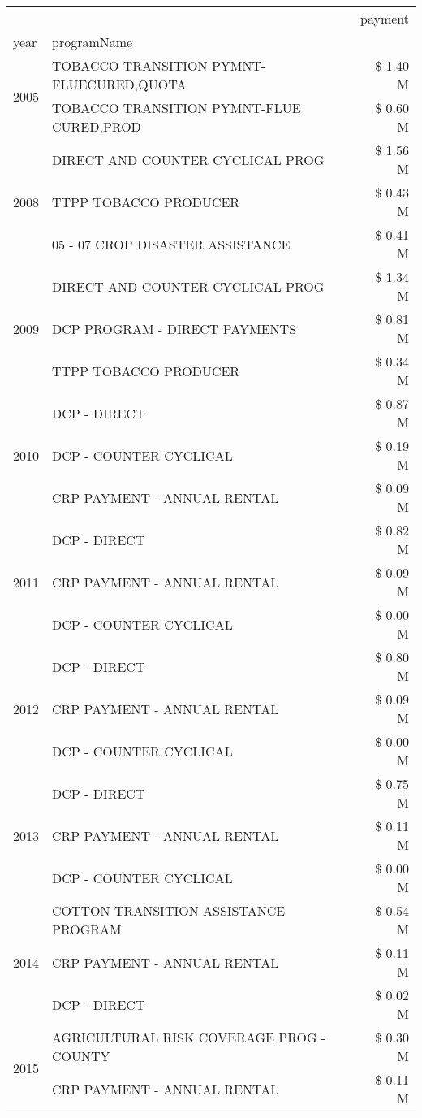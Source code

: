 \begin{tabular}{llr}
\toprule
 &  & payment \\
year & programName &  \\
\midrule
\multirow[t]{2}{*}{2005} & TOBACCO TRANSITION PYMNT-FLUECURED,QUOTA & \$ 1.40 M \\
 & TOBACCO TRANSITION PYMNT-FLUE CURED,PROD & \$ 0.60 M \\
\cline{1-3}
\multirow[t]{3}{*}{2008} & DIRECT AND COUNTER CYCLICAL PROG & \$ 1.56 M \\
 & TTPP TOBACCO PRODUCER & \$ 0.43 M \\
 & 05 - 07 CROP DISASTER ASSISTANCE & \$ 0.41 M \\
\cline{1-3}
\multirow[t]{3}{*}{2009} & DIRECT AND COUNTER CYCLICAL PROG & \$ 1.34 M \\
 & DCP PROGRAM - DIRECT PAYMENTS & \$ 0.81 M \\
 & TTPP TOBACCO PRODUCER & \$ 0.34 M \\
\cline{1-3}
\multirow[t]{3}{*}{2010} & DCP - DIRECT & \$ 0.87 M \\
 & DCP - COUNTER CYCLICAL & \$ 0.19 M \\
 & CRP PAYMENT - ANNUAL RENTAL & \$ 0.09 M \\
\cline{1-3}
\multirow[t]{3}{*}{2011} & DCP - DIRECT & \$ 0.82 M \\
 & CRP PAYMENT - ANNUAL RENTAL & \$ 0.09 M \\
 & DCP - COUNTER CYCLICAL & \$ 0.00 M \\
\cline{1-3}
\multirow[t]{3}{*}{2012} & DCP - DIRECT & \$ 0.80 M \\
 & CRP PAYMENT - ANNUAL RENTAL & \$ 0.09 M \\
 & DCP - COUNTER CYCLICAL & \$ 0.00 M \\
\cline{1-3}
\multirow[t]{3}{*}{2013} & DCP - DIRECT & \$ 0.75 M \\
 & CRP PAYMENT - ANNUAL RENTAL & \$ 0.11 M \\
 & DCP - COUNTER CYCLICAL & \$ 0.00 M \\
\cline{1-3}
\multirow[t]{3}{*}{2014} & COTTON TRANSITION ASSISTANCE PROGRAM & \$ 0.54 M \\
 & CRP PAYMENT - ANNUAL RENTAL & \$ 0.11 M \\
 & DCP - DIRECT & \$ 0.02 M \\
\cline{1-3}
\multirow[t]{3}{*}{2015} & AGRICULTURAL RISK COVERAGE PROG - COUNTY & \$ 0.30 M \\
 & CRP PAYMENT - ANNUAL RENTAL & \$ 0.11 M \\

\end{tabular}
